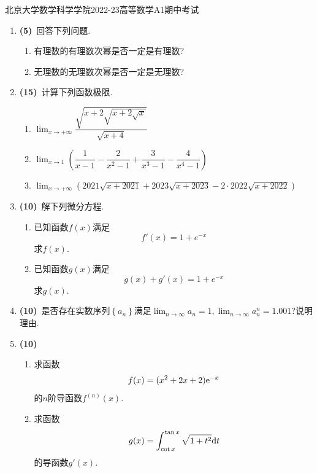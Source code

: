 \documentclass{ctexart}
\begin{document}
\pagestyle{empty}
\begin{center}\Large
    北京大学数学科学学院2022-23高等数学A1期中考试
\end{center}
\begin{enumerate}[leftmargin=*,label=\textbf{\arabic*.},topsep=0pt,parsep=0pt,itemsep=0pt,partopsep=0pt]
    \item \textbf{(5)}\ 回答下列问题.
        \begin{enumerate}[label=\textbf{(\arabic*)}]
            \item 有理数的有理数次幂是否一定是有理数?
            \item 无理数的无理数次幂是否一定是无理数?
        \end{enumerate}

    \item \textbf{(15)}\ 计算下列函数极限.
        \begin{enumerate}[label=\textbf{(\arabic*)}]
            \item $\displaystyle\lim_{x\to+\infty}\dfrac{\sqrt{x+2\sqrt{x+2\sqrt{x}}}}{\sqrt{x+4}}$
            \item $\displaystyle\lim_{x\to1}(\dfrac{1}{x-1}-\dfrac{2}{x^2-1}+\dfrac{3}{x^3-1}-\dfrac{4}{x^4-1})$
            \item $\displaystyle\lim_{x\to+\infty}(2021\sqrt{x+2021}+2023\sqrt{x+2023}-2\cdot2022\sqrt{x+2022})$
        \end{enumerate}

    \item \textbf{(10)}\ 解下列微分方程.
        \begin{enumerate}[label=\textbf{(\arabic*)}]
            \item 已知函数$f(x)$满足$$f'(x)=1+e^{-x}$$求$f(x)$.
            \item 已知函数$g(x)$满足$$g(x)+g'(x)=1+e^{-x}$$求$g(x)$.
        \end{enumerate}

    \item \textbf{(10)}\ 是否存在实数序列$\left\{a_n\right\}$满足$\displaystyle\lim_{n\to\infty}a_n=1,\lim_{n\to\infty}a_n^n=1.001$?说明理由.

    \item \textbf{(10)}\ \begin{enumerate}[label=\textbf{(\arabic*)}]
            \item 求函数$$f(x)=(x^2+2x+2)\mathrm{e}^{-x}$$的$n$阶导函数$f^{(n)}(x)$.
            \item 求函数$$g(x)=\int_{\cot x}^{\tan x}\sqrt{1+t^2}\mathrm{d} t$$的导函数$g'(x)$.
        \end{enumerate}


\end{enumerate}
\end{document}
